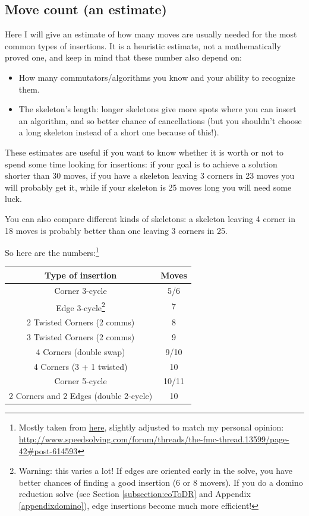 \documentclass[11pt,a4paper]{book}
\begin{document}
\subsection{Move count (an estimate)}

Here I will give an estimate of how many moves are usually needed for the most common types of insertions. It is a heuristic estimate, not a mathematically proved one, and keep in mind that these number also depend on:
\begin{itemize}
\item How many commutators/algorithms you know and your ability to recognize them.
\item The skeleton's length: longer skeletons give more spots where you can insert an algorithm, and so better chance of cancellations (but you shouldn't choose a long skeleton instead of a short one because of this!).
\end{itemize}
These estimates are useful if you want to know whether it is worth or not to spend some time looking for insertions: if your goal is to achieve a solution shorter than 30 moves, if you have a skeleton leaving 3 corners in 23 moves you will probably get it, while if your skeleton is 25 moves long you will need some luck.

You can also compare different kinds of skeletons: a skeleton leaving 4 corner in 18 moves is probably better than one leaving 3 corners in 25.

So here are the numbers:\footnote{Mostly taken from \href{https://www.speedsolving.com/forum/threads/the-fmc-thread.13599/page-42\#post-614593}{here}, slightly adjusted to match my personal opinion: \url{http://www.speedsolving.com/forum/threads/the-fmc-thread.13599/page-42\#post-614593}}

\begin{center}
\begin{tabular}{|c|c|}
\hline
\textbf{Type of insertion} & \textbf{Moves}\\
\hline
Corner 3-cycle & 5/6\\
\hline
Edge 3-cycle\footnote{Warning: this varies a lot! If edges are oriented early in the solve, you have better chances of finding a good insertion (6 or 8 movers). If you do a domino reduction solve (see Section \ref{subsection:eoToDR} and Appendix \ref{appendixdomino}), edge insertions become much more efficient!} & 7\\
\hline
2 Twisted Corners (2 comms) & 8\\
\hline
3 Twisted Corners (2 comms) & 9\\
\hline
4 Corners (double swap) & 9/10\\
\hline
4 Corners (3 + 1 twisted) & 10\\
\hline
Corner 5-cycle & 10/11\\
\hline
2 Corners and 2 Edges (double 2-cycle) & 10\\
\hline
\end{tabular}
\end{center}
\end{document}
